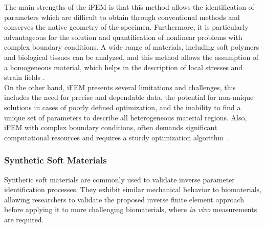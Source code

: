 The main strengths of the iFEM is that this method allows the identification of parameters which are difficult to obtain 
through conventional methods and conserves the native geometry of the specimen. Furthermore, it is particularly advantageous for the 
solution and quantification of nonlinear problems with complex boundary conditions. A wide 
range of materials, including soft polymers and biological tissues can be analyzed, and this method allows the 
assumption of a homogeneous material, which helps in the description of local stresses and strain fields \cite{Seshaiyer2003}.\\

On the other hand, iFEM presents several limitations and challenges, this includes the need for precise and dependable 
data, the potential for non-unique solutions in cases of poorly defined optimization, and the inability to find a 
unique set of parameters to describe all heterogeneous material regions. Also, iFEM with complex boundary conditions, often demands
significant computational resources and requires a sturdy optimization algorithm \cite{Giudice2021}.\\

\subsubsection*{Synthetic Soft Materials}
Synthetic soft materials are commonly used to validate inverse parameter identification processes. 
They exhibit similar mechanical behavior to biomaterials, allowing researchers to validate the proposed 
inverse finite element approach before applying it to more challenging biomaterials, where \textit{in vivo} measurements are required.

